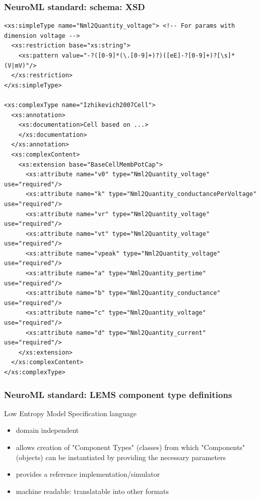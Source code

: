 \begin{frame}[fragile,c]
  \frametitle{NeuroML standard: schema: XSD}
  \begin{center}
    \begin{verbatim}
<xs:simpleType name="Nml2Quantity_voltage"> <!-- For params with dimension voltage -->
  <xs:restriction base="xs:string">
    <xs:pattern value="-?([0-9]*(\.[0-9]+)?)([eE]-?[0-9]+)?[\s]*(V|mV)"/>
  </xs:restriction>
</xs:simpleType>

<xs:complexType name="Izhikevich2007Cell">
  <xs:annotation>
    <xs:documentation>Cell based on ...>
    </xs:documentation>
  </xs:annotation>
  <xs:complexContent>
    <xs:extension base="BaseCellMembPotCap">
      <xs:attribute name="v0" type="Nml2Quantity_voltage" use="required"/>
      <xs:attribute name="k" type="Nml2Quantity_conductancePerVoltage" use="required"/>
      <xs:attribute name="vr" type="Nml2Quantity_voltage" use="required"/>
      <xs:attribute name="vt" type="Nml2Quantity_voltage" use="required"/>
      <xs:attribute name="vpeak" type="Nml2Quantity_voltage" use="required"/>
      <xs:attribute name="a" type="Nml2Quantity_pertime" use="required"/>
      <xs:attribute name="b" type="Nml2Quantity_conductance" use="required"/>
      <xs:attribute name="c" type="Nml2Quantity_voltage" use="required"/>
      <xs:attribute name="d" type="Nml2Quantity_current" use="required"/>
    </xs:extension>
  </xs:complexContent>
</xs:complexType>
    \end{verbatim}
  \end{center}
\end{frame}
\begin{frame}[t]
  \frametitle{NeuroML standard: LEMS component type definitions}
  \alert{L}ow \alert{E}ntropy \alert{M}odel \alert{S}pecification language
    \begin{itemize}
      \item domain independent
      \item allows creation of "Component Types" \alert{(classes)} from which "Components" \alert{(objects)} can be instantiated by providing the necessary parameters
      \item provides a \alert{reference implementation/simulator}
        \pause{}
      \item machine readable: \alert{translatable} into other formats
    \end{itemize}
\end{frame}
